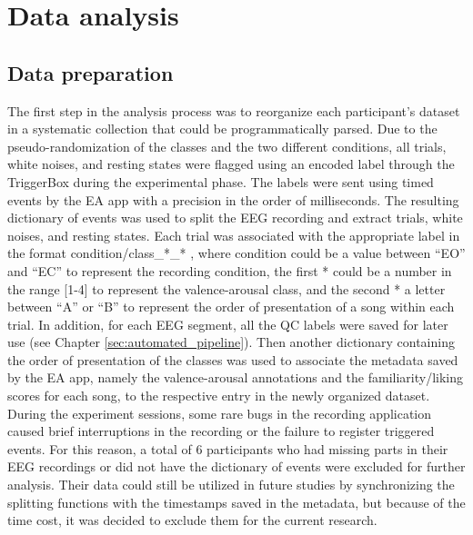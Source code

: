 \section{Data analysis}
\label{sec:data_analysis}
\subsection{Data preparation}
\label{sec:data_preparation}
The first step in the analysis process was to reorganize each participant’s dataset in a systematic collection that could be programmatically parsed. Due to the pseudo-randomization of the classes and the two different conditions, all trials, white noises, and resting states were flagged using an encoded label through the TriggerBox during the experimental phase. The labels were sent using timed events by the \ac{EA} app with a precision in the order of milliseconds. The resulting dictionary of events was used to split the \ac{EEG} recording and extract trials, white noises, and resting states. Each trial was associated with the appropriate label in the format condition/class\_*\_* , where condition could be a value between “EO” and “EC” to represent the recording condition, the first * could be a number in the range [1-4] to represent the valence-arousal  class, and the second * a letter between “A” or “B” to represent the order of presentation of a song within each trial. In addition, for each \ac{EEG} segment, all the \ac{QC} labels were saved for later use (see Chapter \ref{sec:automated_pipeline}). Then another dictionary containing the order of presentation of the classes was used to associate the metadata saved by the \ac{EA} app, namely the valence-arousal annotations and the familiarity/liking scores for each song, to the respective entry in the newly organized dataset. During the experiment sessions, some rare bugs in the recording application caused brief interruptions in the recording or the failure to register triggered events. For this reason, a total of 6 participants who had missing parts in their \ac{EEG} recordings or did not have the dictionary of events were excluded for further analysis. Their data could still be utilized in future studies by synchronizing the splitting functions with the timestamps saved in the metadata, but because of the time cost, it was decided to exclude them for the current research.

